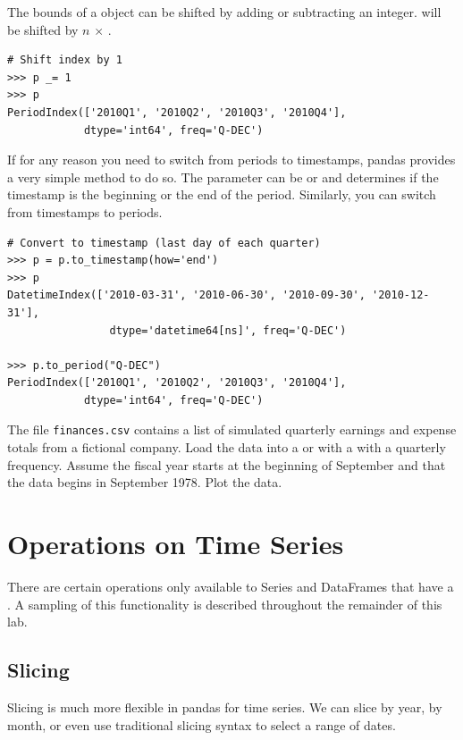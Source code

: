 The bounds of a  object can be shifted by adding or subtracting an integer.
  will be shifted by $n$ $\times$ .

\begin{lstlisting}
# Shift index by 1
>>> p _= 1
>>> p
PeriodIndex(['2010Q1', '2010Q2', '2010Q3', '2010Q4'],
            dtype='int64', freq='Q-DEC')
\end{lstlisting}

If for any reason you need to switch from periods to timestamps, pandas provides a very simple method to do so.
The  parameter can be  or  and determines if the timestamp is the beginning or the end of the period.
Similarly, you can switch from timestamps to periods.

\begin{lstlisting}
# Convert to timestamp (last day of each quarter)
>>> p = p.to_timestamp(how='end')
>>> p
DatetimeIndex(['2010-03-31', '2010-06-30', '2010-09-30', '2010-12-31'],
                dtype='datetime64[ns]', freq='Q-DEC')

>>> p.to_period("Q-DEC")
PeriodIndex(['2010Q1', '2010Q2', '2010Q3', '2010Q4'],
            dtype='int64', freq='Q-DEC')

\end{lstlisting}

\begin{problem} %
The file \texttt{finances.csv} contains a list of simulated quarterly earnings and expense totals from a fictional company.
Load the data into a  or  with a  with a quarterly frequency.
Assume the fiscal year starts at the beginning of September and that the data begins in September 1978.
Plot the data.
\end{problem}

\section*{Operations on Time Series}

There are certain operations only available to Series and DataFrames that have a . A sampling of this functionality is described throughout the remainder of this lab.

\subsection*{Slicing}

Slicing is much more flexible in pandas for time series. We can slice by year, by month, or even use traditional slicing syntax to select a range of dates.

